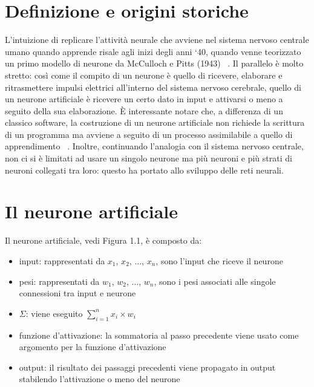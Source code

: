 \documentclass[12pt]{report}
\begin{document}
\section{Definizione e origini storiche}
L’intuizione di replicare l’attività neurale che avviene nel sistema nervoso centrale umano quando apprende risale agli inizi degli anni ‘40, quando venne teorizzato un primo modello di neurone da McCulloch e Pitts (1943) ~\cite{McCulloch}. Il parallelo è molto stretto: così come il compito di un neurone è quello di ricevere, elaborare e ritrasmettere impulsi elettrici all’interno del sistema nervoso cerebrale, quello di un neurone artificiale è ricevere un certo dato in input e attivarsi o meno a seguito della sua elaborazione.
È interessante notare che, a differenza di un classico software, la costruzione di un neurone artificiale non richiede la scrittura di un programma ma avviene a seguito di un processo assimilabile a quello di apprendimento ~\cite{Perceptron}. Inoltre, continuando l'analogia con il sistema nervoso centrale, non ci si è limitati ad usare un singolo neurone ma più neuroni e più strati di neuroni collegati tra loro: questo ha portato allo sviluppo delle reti neurali.

\section{Il neurone artificiale}
Il neurone artificiale, vedi Figura 1.1, è composto da:
\begin{itemize}
\item{input}: rappresentati da $x_1$, $x_2$, $\dots$, $x_n$, sono l'input che riceve il neurone
\item{pesi}: rappresentati da $w_1$, $w_2$, $\dots$, $w_n$, sono i pesi associati alle singole connessioni tra input e neurone
\item{$\Sigma$}: viene eseguito $\displaystyle{\sum_{i=1}^n x_i \times w_i}$
\item{funzione d'attivazione}: la sommatoria al passo precedente viene usato come argomento per la funzione d'attivazione
\item{output}: il risultato dei passaggi precedenti viene propagato in output stabilendo l'attivazione o meno del neurone
\end{itemize}
\end{document}
